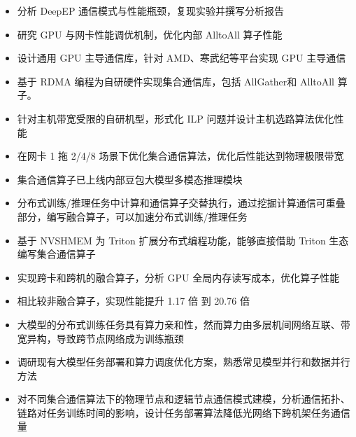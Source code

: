 \documentclass{resume}
\begin{document}
\begin{itemize}[parsep=0.5ex]
  \item 分析 DeepEP 通信模式与性能瓶颈，复现实验并撰写分析报告
  \item 研究 GPU 与网卡性能调优机制，优化内部 AlltoAll 算子性能
  \item 设计通用 GPU 主导通信库，针对 AMD、寒武纪等平台实现 GPU 主导通信
\end{itemize}

\begin{itemize}[parsep=0.5ex]
  \item 基于 RDMA 编程为自研硬件实现集合通信库，包括 AllGather和 AlltoAll 算子。
  \item 针对主机带宽受限的自研机型，形式化 ILP 问题并设计主机选路算法优化性能
  \item 在网卡 1 拖 2/4/8 场景下优化集合通信算法，优化后性能达到物理极限带宽
  \item 集合通信算子已上线内部豆包大模型多模态推理模块
\end{itemize}

\begin{itemize}[parsep=0.5ex]
  \item 分布式训练/推理任务中计算和通信算子交替执行，通过挖掘计算通信可重叠部分，编写融合算子，可以加速分布式训练/推理任务
  \item 基于 NVSHMEM 为 Triton 扩展分布式编程功能，能够直接借助 Triton 生态编写集合通信算子
  \item 实现跨卡和跨机的融合算子，分析 GPU 全局内存读写成本，优化算子性能
  \item 相比较非融合算子，实现性能提升 1.17 倍 到 20.76 倍
\end{itemize}

\begin{itemize}[parsep=0.5ex]
  \item 大模型的分布式训练任务具有算力亲和性，然而算力由多层机间网络互联、带宽异构，导致跨节点网络成为训练瓶颈
  \item 调研现有大模型任务部署和算力调度优化方案，熟悉常见模型并行和数据并行方法
  \item 对不同集合通信算法下的物理节点和逻辑节点通信模式建模，分析通信拓扑、链路对任务训练时间的影响，设计任务部署算法降低光网络下跨机架任务通信量
\end{itemize}
\end{document}

